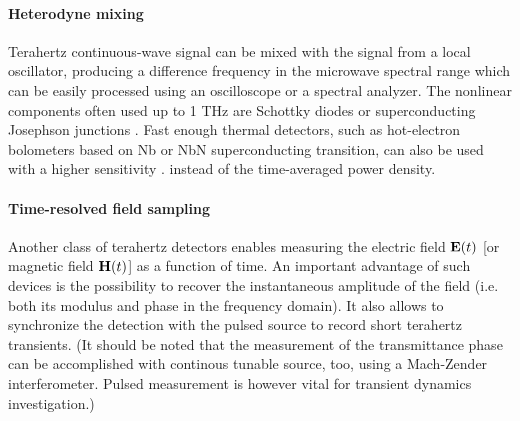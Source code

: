 \paragraph{Heterodyne mixing}%
Terahertz continuous-wave signal can be mixed with the signal from a local oscillator, producing a difference frequency in the microwave spectral range which can be easily processed using an oscilloscope or a spectral analyzer. The nonlinear components often used up to 1 THz are Schottky diodes or superconducting Josephson junctions \cite{face1986high}.
Fast enough thermal detectors, such as hot-electron bolometers based on Nb or NbN superconducting transition, can also be used with a higher sensitivity \cite{lee2008book}.
 instead of the time-averaged power density.

\paragraph{Time-resolved field sampling}%
Another class of terahertz detectors enables measuring the electric field $\mathbf{E}(t)$ [or magnetic field $\mathbf{H}(t)$] as a function of time. An important advantage of such devices is the possibility to recover the instantaneous amplitude of the field (i.e. both its modulus and phase in the frequency domain). It also allows to synchronize the detection with the pulsed source to record short terahertz transients.
(It should be noted that the measurement of the transmittance phase can be accomplished with continous tunable source, too, using a Mach-Zender interferometer.
Pulsed measurement is however vital for transient dynamics investigation.)

